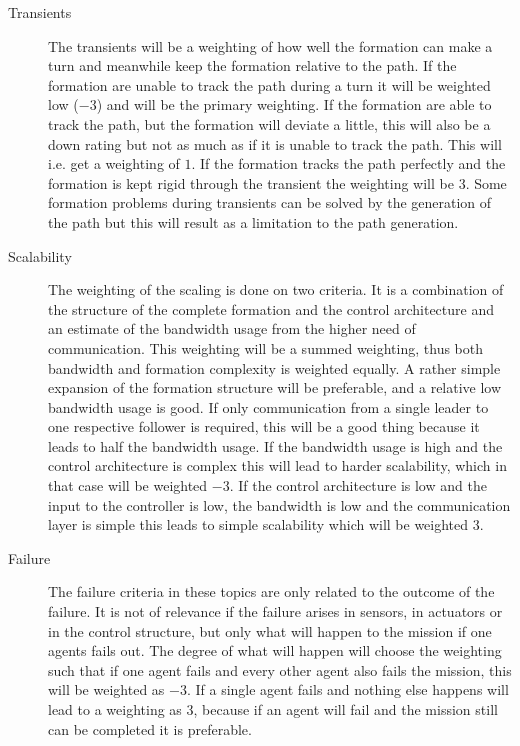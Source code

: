 \begin{description}
\item[Transients] The transients will be a weighting of how well the formation can make a turn and meanwhile keep the formation relative to the path. If the formation are unable to track the path during a turn it will be weighted low ($-3$) and will be the primary weighting. If the formation are able to track the path, but the formation will deviate a little, this will also be a down rating but not as much as if it is unable to track the path. This will i.e. get a weighting of $1$. If the formation tracks the path perfectly and the formation is kept rigid through the transient the weighting will be $3$. Some formation problems during transients can be solved by the generation of the path but this will result as a limitation to the path generation. 

\item[Scalability] The weighting of the scaling is done on two criteria. It is a combination of the structure of the complete formation and the control architecture and an estimate of the bandwidth usage from the higher need of communication. This weighting will be a summed weighting, thus both bandwidth and formation complexity is weighted equally. A rather simple expansion of the formation structure will be preferable, and a relative low bandwidth usage is good. If only communication from a single leader to one respective follower is required, this will be a good thing because it leads to half the bandwidth usage. If the bandwidth usage is high and the control architecture is complex this will lead to harder scalability, which in that case will be weighted $-3$. If the control architecture is low and the input to the controller is low, the bandwidth is low and the communication layer is simple this leads to simple scalability which will be weighted $3$.

\item[Failure] The failure criteria in these topics are only related to the outcome of the failure. It is not of relevance if the failure arises in sensors, in actuators or in the control structure, but only what will happen to the mission if one agents fails out. The degree of what will happen will choose the weighting such that if one agent fails and every other agent also fails the mission, this will be weighted as $-3$. If a single agent fails and nothing else happens will lead to a weighting as $3$, because if an agent will fail and the mission still can be completed it is preferable.
\end{description}

